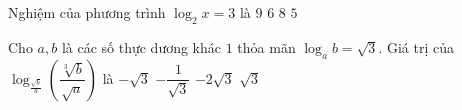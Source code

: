 \begin{ex}%
Nghiệm của phương trình $\log_2x=3$ là
\choice
{$9$}
{$6$}
{\True $8$}
{$5$}
\end{ex}

\begin{ex}%
Cho $a, b$ là các số thực dương khác $1$ thỏa mãn $\log_ab=\sqrt{3}$. Giá trị của $\log_{\frac{\sqrt{b}}{a}}\left(\dfrac{\sqrt[3]{b}}{\sqrt{a}}\right)$ là
\choice
{$-\sqrt{3}$}
{\True $-\dfrac{1}{\sqrt{3}}$}
{$-2\sqrt{3}$}
{$\sqrt{3}$}
\end{ex}

